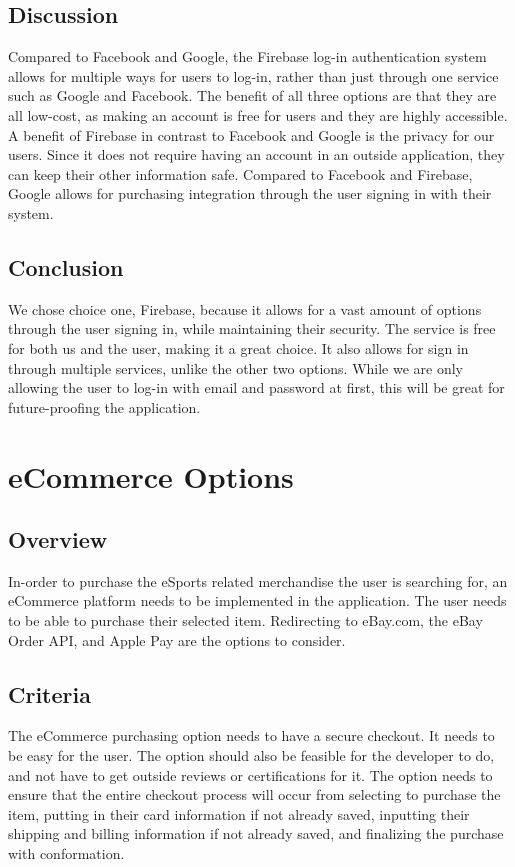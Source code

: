 \documentclass[onecolumn, draftclsnofoot,10pt, compsoc]{IEEEtran}
\begin{document}
\subsection{Discussion}
Compared to Facebook and Google, the Firebase log-in authentication system allows for multiple ways for users to log-in, rather than just through one service such as Google and Facebook. The benefit of all three options are that they are all low-cost, as making an account is free for users and they are highly accessible. A benefit of Firebase in contrast to Facebook and Google is the privacy for our users. Since it does not require having an account in an outside application, they can keep their other information safe. Compared to Facebook and Firebase, Google allows for purchasing integration through the user signing in with their system. 

\subsection{Conclusion}
We chose choice one, Firebase, because it allows for a vast amount of options through the user signing in, while maintaining their security. The service is free for both us and the user, making it a great choice. It also allows for sign in through multiple services, unlike the other two options. While we are only allowing the user to log-in with email and password at first, this will be great for future-proofing the application. 

\section{eCommerce Options}

\subsection{Overview}
In-order to purchase the eSports related merchandise the user is searching for, an eCommerce platform needs to be implemented in the application. The user needs to be able to purchase their selected item. Redirecting to eBay.com, the eBay Order API, and Apple Pay are the options to consider.

\subsection{Criteria}
The eCommerce purchasing option needs to have a secure checkout. It needs to be easy for the user. The option should also be feasible for the developer to do, and not have to get outside reviews or certifications for it. The option needs to ensure that the entire checkout process will occur from selecting to purchase the item, putting in their card information if not already saved, inputting their shipping and billing information if not already saved, and finalizing the purchase with conformation.
\end{document}

